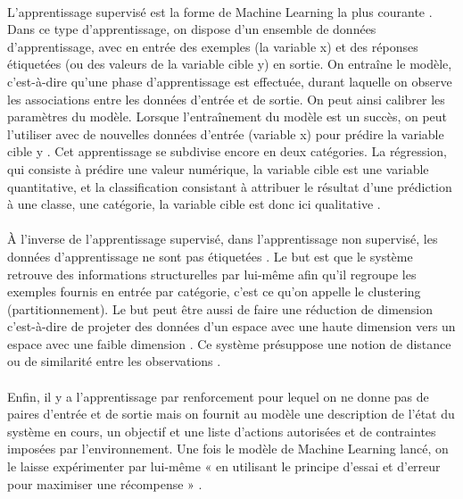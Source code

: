 \documentclass{article}
\begin{document}
\paragraph{}
L’apprentissage supervisé est la forme de Machine Learning la plus courante \cite{lemberger2019big}. Dans ce type d’apprentissage, on dispose d’un ensemble de données d’apprentissage, avec en entrée des exemples (la variable x) et des réponses étiquetées (ou des valeurs de la variable cible y) en sortie. On entraîne le modèle, c’est-à-dire qu’une phase d’apprentissage est effectuée, durant laquelle on observe les associations entre les données d’entrée et de sortie. On peut ainsi calibrer les paramètres du modèle. Lorsque l’entraînement du modèle est un succès, on peut l’utiliser avec de nouvelles données d’entrée (variable x) pour prédire la variable cible y \cite{janiesch2021machine,lemberger2019big}. Cet apprentissage se subdivise encore en deux  catégories. La régression, qui consiste à prédire une valeur numérique, la variable cible est une variable quantitative\cite{lemberger2019big}, et la classification consistant à attribuer le résultat d’une prédiction à une classe, une catégorie, la variable cible est donc ici qualitative \cite{janiesch2021machine,lemberger2019big}.
\paragraph{}
À l’inverse de l’apprentissage supervisé, dans l’apprentissage non supervisé, les données d’apprentissage ne sont pas étiquetées \cite{janiesch2021machine, lemberger2019big}. Le but est que le système retrouve des informations structurelles par lui-même afin qu’il regroupe les exemples fournis en entrée par catégorie, c’est ce qu’on appelle le clustering (partitionnement). Le but peut être aussi de faire une réduction de dimension c’est-à-dire de projeter des données d’un espace avec une haute dimension vers un espace avec une faible dimension \cite{janiesch2021machine}. Ce système présuppose une notion de distance ou de similarité entre les observations \cite{lemberger2019big}. 
\paragraph{}
Enfin, il y a l’apprentissage par renforcement pour lequel on ne donne pas de paires d’entrée et de sortie mais on fournit au modèle une description de l’état du système en cours, un objectif et une liste d’actions autorisées et de contraintes imposées par l’environnement. Une fois le modèle de Machine Learning lancé, on le laisse expérimenter par lui-même « en utilisant le principe d’essai et d’erreur pour maximiser une récompense » \cite{janiesch2021machine}. 
\end{document}
